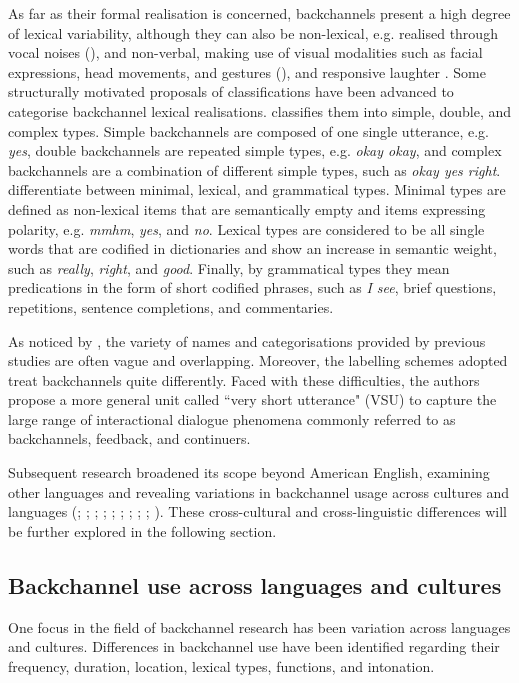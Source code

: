As far as their formal realisation is concerned, backchannels present a high degree of lexical variability, although they can also be non-lexical, e.g. realised through vocal noises (\citealt{WongPeters2007}), and non-verbal, making use of visual modalities such as facial expressions, head movements, and gestures (\citealt{Tree2014}), and responsive laughter \citep{Hasegawa2014}. Some structurally motivated proposals of classifications have been advanced to categorise backchannel lexical realisations. \citet{Tottie1991} classifies them into simple, double, and complex types. Simple backchannels are composed of one single utterance, e.g. \textit{yes}, double backchannels are repeated simple types, e.g. \textit{okay okay}, and complex backchannels are a combination of different simple types, such as \textit{okay yes right}. \citet{WongPeters2007} differentiate between minimal, lexical, and grammatical types. Minimal types are defined as non-lexical items that are semantically empty and items expressing polarity, e.g. \textit{mmhm}, \textit{yes}, and \textit{no}. Lexical types are considered to be all single words that are codified in dictionaries and show an increase in semantic weight, such as \textit{really}, \textit{right}, and \textit{good}. Finally, by grammatical types they mean predications in the form of short codified phrases, such as \textit{I see}, brief questions, repetitions, sentence completions, and commentaries.

As noticed by \citet{EdlundEtAl2010}, the variety of names and categorisations provided by previous studies are often vague and overlapping. Moreover, the labelling schemes adopted treat backchannels quite differently. Faced with these difficulties, the authors propose a more general unit called ``very short utterance" (VSU) to capture the large range of interactional dialogue phenomena commonly referred to as backchannels, feedback, and continuers.

Subsequent research broadened its scope beyond American English, examining other languages and revealing variations in backchannel usage across cultures and languages (\citealt{Berry1994}; \citealt{ClancyEtAl1996}; \citealt{Cutrone2005,Cutrone2014}; \citealt{Heinz2003}; \citealt{KraazBernaisch2022}; \citealt{Li2006}; \citealt{Nurjaleka2019}; \citealt{TaoThompson1991}; \citealt{Tottie1991}; \citealt{WardTsukahara2000}). These cross-cultural and cross-linguistic differences will be further explored in the following section.

\subsection{Backchannel use across languages and cultures}
\label{sec:4.1.3}
One focus in the field of backchannel research has been variation across languages and cultures. Differences in backchannel use have been identified regarding their frequency, duration, location, lexical types, functions, and intonation.

